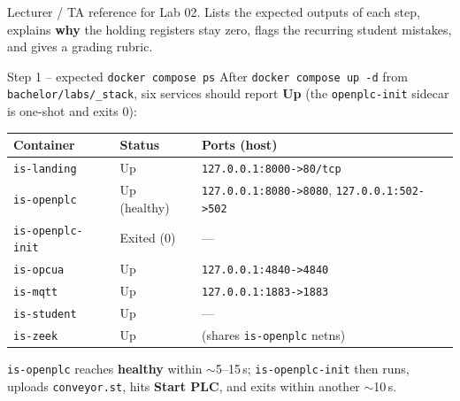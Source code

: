\documentclass[11pt,a4paper]{article}
\begin{document}
\labheader

\begin{goalbox}
Lecturer / TA reference for Lab 02. Lists the expected outputs of each step, explains \textbf{why} the holding registers stay zero, flags the recurring student mistakes, and gives a grading rubric.
\end{goalbox}

\begin{solutionbox}{Step 1 -- expected \texttt{docker compose ps}}
After \texttt{docker compose up -d} from \texttt{bachelor/labs/\_stack}, six services should report \textbf{Up} (the \texttt{openplc-init} sidecar is one-shot and exits 0):

\begin{center}\footnotesize
\begin{tabular}{@{}lll@{}}
\toprule
\textbf{Container} & \textbf{Status} & \textbf{Ports (host)} \\
\midrule
\texttt{is-landing}      & Up           & \texttt{127.0.0.1:8000->80/tcp} \\
\texttt{is-openplc}      & Up (healthy) & \texttt{127.0.0.1:8080->8080}, \texttt{127.0.0.1:502->502} \\
\texttt{is-openplc-init} & Exited (0)   & --- \\
\texttt{is-opcua}        & Up           & \texttt{127.0.0.1:4840->4840} \\
\texttt{is-mqtt}         & Up           & \texttt{127.0.0.1:1883->1883} \\
\texttt{is-student}      & Up           & --- \\
\texttt{is-zeek}         & Up           & (shares \texttt{is-openplc} netns) \\
\bottomrule
\end{tabular}
\end{center}

\texttt{is-openplc} reaches \textbf{healthy} within $\sim$5--15\,s; \texttt{is-openplc-init} then runs, uploads \texttt{conveyor.st}, hits \textbf{Start PLC}, and exits within another $\sim$10\,s.
\end{solutionbox}
\end{document}
